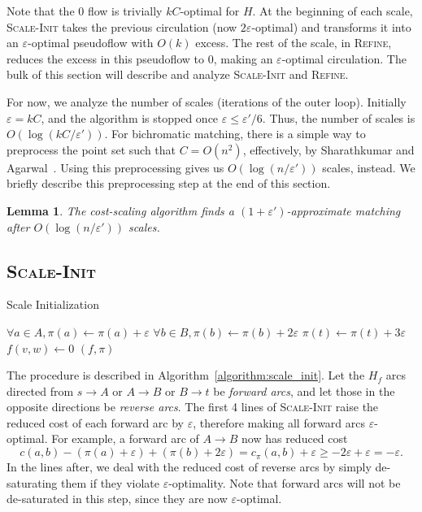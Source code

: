 \documentclass[11pt]{article}
\def\eps{\varepsilon}
\theoremstyle{plain}
\newtheorem{lemma}{Lemma}
\begin{document}
Note that the 0 flow is trivially $kC$-optimal for $H$.
At the beginning of each scale, \textsc{Scale-Init} takes the previous
circulation (now $2\eps$-optimal) and transforms it into an $\eps$-optimal
pseudoflow with $O(k)$ excess.
The rest of the scale, in \textsc{Refine}, reduces the excess in this
pseudoflow to 0, making an $\eps$-optimal circulation.
The bulk of this section will describe and analyze \textsc{Scale-Init} and
\textsc{Refine}.

For now, we analyze the number of scales (iterations of the outer loop).
Initially $\eps = kC$, and the algorithm is stopped once $\eps \leq \eps'/6$.
Thus, the number of scales is $O(\log(kC/\eps'))$.
For bichromatic matching, there is a simple way to preprocess the point set
such that $C = O(n^2)$, effectively, by Sharathkumar and Agarwal~\cite{SA12}.
Using this preprocessing gives us $O(\log(n/\eps'))$ scales, instead.
We briefly describe this preprocessing step at the end of this section.

\begin{lemma}
\label{lemma:goldberg_scales}
The cost-scaling algorithm finds a $(1 + \eps')$-approximate matching after
$O(\log(n/\eps'))$ scales.
\end{lemma}

\subsection{\textsc{Scale-Init}}

\begin{algorithm}
\caption{Scale Initialization}
\label{algorithm:scale_init}
\begin{algorithmic}[1]
	\State $\forall a \in A, \pi(a) \gets \pi(a) + \eps$
	\State $\forall b \in B, \pi(b) \gets \pi(b) + 2\eps$
	\State $\pi(t) \gets \pi(t) + 3\eps$
	\Statex %
		\If{$c_\pi(w, v) < -\eps$}
			\State $f(v, w) \gets 0$
		\EndIf
	\EndFor
	\State\Return $(f, \pi)$
\EndFunction
\end{algorithmic}
\end{algorithm}

The procedure is described in Algorithm~\ref{algorithm:scale_init}.
Let the $H_f$ arcs directed from $s \to A$ or $A \to B$ or $B \to t$ be
\emph{forward arcs}, and let those in the opposite directions be
\emph{reverse arcs}.
The first 4 lines of \textsc{Scale-Init} raise the reduced cost of each
forward arc by $\eps$, therefore making all forward arcs $\eps$-optimal.
For example, a forward arc of $A \to B$ now has reduced cost
\begin{equation*}
	c(a, b) - (\pi(a) + \eps) + (\pi(b) + 2\eps)
	= c_\pi(a, b) + \eps
	\geq -2\eps + \eps
	= -\eps.
\end{equation*}
In the lines after, we deal with the reduced cost of reverse arcs by simply
de-saturating them if they violate $\eps$-optimality.
Note that forward arcs will not be de-saturated in this step, since they are
now $\eps$-optimal.
\end{document}
